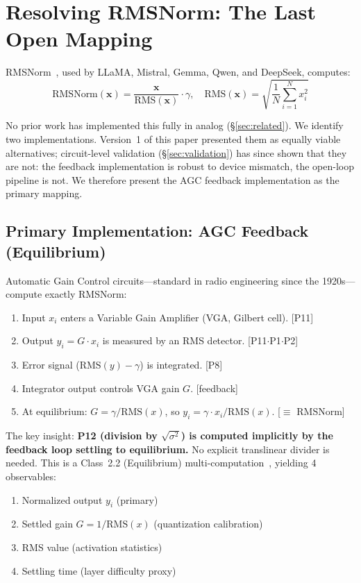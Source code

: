 \documentclass[11pt]{article}
\begin{document}
\section{Resolving RMSNorm: The Last Open Mapping}
\label{sec:rmsnorm}

RMSNorm~\cite{zhang_rmsnorm2019}, used by LLaMA, Mistral, Gemma, Qwen, and DeepSeek, computes:
\begin{equation}
\text{RMSNorm}(\mathbf{x}) = \frac{\mathbf{x}}{\text{RMS}(\mathbf{x})} \cdot \gamma, \quad \text{RMS}(\mathbf{x}) = \sqrt{\frac{1}{N}\sum_{i=1}^{N} x_i^2}
\end{equation}

No prior work has implemented this fully in analog (\S\ref{sec:related}). We identify two implementations. Version~1 of this paper presented them as equally viable alternatives; circuit-level validation (\S\ref{sec:validation}) has since shown that they are not: the feedback implementation is robust to device mismatch, the open-loop pipeline is not. We therefore present the AGC feedback implementation as the primary mapping.

\subsection{Primary Implementation: AGC Feedback (Equilibrium)}
\label{sec:agc}

Automatic Gain Control circuits---standard in radio engineering since the 1920s---compute exactly RMSNorm:

\begin{enumerate}[leftmargin=*]
\item Input $x_i$ enters a Variable Gain Amplifier (VGA, Gilbert cell). \hfill [P11]
\item Output $y_i = G \cdot x_i$ is measured by an RMS detector. \hfill [P11$\cdot$P1$\cdot$P2]
\item Error signal ($\text{RMS}(y) - \gamma$) is integrated. \hfill [P8]
\item Integrator output controls VGA gain $G$. \hfill [feedback]
\item At equilibrium: $G = \gamma / \text{RMS}(x)$, so $y_i = \gamma \cdot x_i / \text{RMS}(x)$. \hfill [$\equiv$ RMSNorm]
\end{enumerate}

The key insight: \textbf{P12 (division by $\sqrt{\sigma^2}$) is computed implicitly by the feedback loop settling to equilibrium.} No explicit translinear divider is needed. This is a Class~2.2 (Equilibrium) multi-computation~\cite{bieg2026}, yielding 4 observables:
\begin{enumerate}
\item Normalized output $y_i$ (primary)
\item Settled gain $G = 1/\text{RMS}(x)$ (quantization calibration)
\item RMS value (activation statistics)
\item Settling time (layer difficulty proxy)
\end{enumerate}
\end{document}
